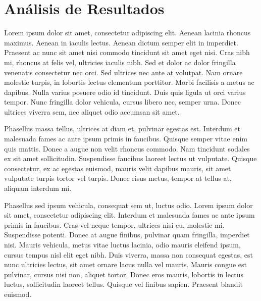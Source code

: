 
\chapter{Análisis de Resultados}
\label{chap:resultsAnalysis}
Lorem ipsum dolor sit amet, consectetur adipiscing elit. Aenean lacinia rhoncus maximus. Aenean in iaculis lectus. Aenean dictum semper elit in imperdiet. Praesent ac nunc sit amet nisi commodo tincidunt sit amet eget nisi. Cras nibh mi, rhoncus at felis vel, ultricies iaculis nibh. Sed et dolor ac dolor fringilla venenatis consectetur nec orci. Sed ultrices nec ante at volutpat. Nam ornare molestie turpis, in lobortis lectus elementum porttitor. Morbi facilisis a metus ac dapibus. Nulla varius posuere odio id tincidunt. Duis quis ligula ut orci varius tempor. Nunc fringilla dolor vehicula, cursus libero nec, semper urna. Donec ultrices viverra sem, nec aliquet odio accumsan sit amet.

Phasellus massa tellus, ultrices at diam et, pulvinar egestas est. Interdum et malesuada fames ac ante ipsum primis in faucibus. Quisque semper vitae enim quis mattis. Donec a augue non velit rhoncus commodo. Nam tincidunt sodales ex sit amet sollicitudin. Suspendisse faucibus laoreet lectus ut vulputate. Quisque consectetur, ex ac egestas euismod, mauris velit dapibus mauris, sit amet vulputate turpis tortor vel turpis. Donec risus metus, tempor at tellus at, aliquam interdum mi.

Phasellus sed ipsum vehicula, consequat sem ut, luctus odio. Lorem ipsum dolor sit amet, consectetur adipiscing elit. Interdum et malesuada fames ac ante ipsum primis in faucibus. Cras vel neque tempor, ultrices nisi eu, molestie mi. Suspendisse potenti. Donec at augue finibus, pulvinar quam fringilla, imperdiet nisi. Mauris vehicula, metus vitae luctus lacinia, odio mauris eleifend ipsum, cursus tempus nisl elit eget nibh. Duis viverra, massa non consequat egestas, est nunc ultricies lectus, sit amet ornare lacus nulla vel mauris. Mauris congue est pulvinar, cursus nisi non, aliquet tortor. Donec eros mauris, lobortis in lectus luctus, sollicitudin laoreet tellus. Quisque vel finibus sapien. Praesent blandit euismod.
